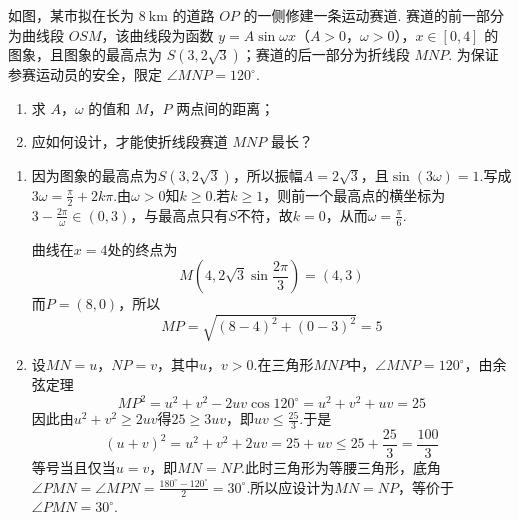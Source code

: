 \begin{problem}
如图，某市拟在长为 \(8 \mathrm{~km}\) 的道路 \(OP\) 的一侧修建一条运动赛道. 赛道的前一部分为曲线段 \(OSM\)，该曲线段为函数 \(y = A \sin \omega x\)（\(A > 0\)，\(\omega > 0\)），\(x \in [0,4]\) 的图象，且图象的最高点为 \(S(3, 2\sqrt{3})\)；赛道的后一部分为折线段 \(MNP\). 为保证参赛运动员的安全，限定 \(\angle MNP = 120^{\circ}\).

\begin{enumerate}
\item 求 \(A\)，\(\omega\) 的值和 \(M\)，\(P\) 两点间的距离；
\item 应如何设计，才能使折线段赛道 \(MNP\) 最长？
\end{enumerate}

\begin{solution}
\begin{enumerate}
\item 因为图象的最高点为\(S(3,2\sqrt{3})\)，所以振幅\(A=2\sqrt{3}\)，且\(\sin(3\omega)=1\).写成\(3\omega=\frac{\pi}{2}+2k\pi\).由\(\omega>0\)知\(k\geqslant0\).若\(k\geqslant1\)，则前一个最高点的横坐标为\(3-\frac{2\pi}{\omega}\in(0,3)\)，与最高点只有\(S\)不符，故\(k=0\)，从而\(\omega=\frac{\pi}{6}\).

曲线在\(x=4\)处的终点为
\[
M\left(4,2\sqrt{3}\sin\frac{2\pi}{3}\right)=(4,3)
\]
而\(P=(8,0)\)，所以
\[
MP=\sqrt{(8-4)^2+(0-3)^2}=5
\]

\item 设\(MN=u\)，\(NP=v\)，其中\(u\)，\(v>0\).在三角形\(MNP\)中，\(\angle MNP=120^{\circ}\)，由余弦定理
\[
MP^2=u^2+v^2-2uv\cos120^{\circ}=u^2+v^2+uv=25
\]
因此由\(u^2+v^2\geqslant2uv\)得\(25\geqslant3uv\)，即\(uv\leqslant\frac{25}{3}\).于是
\[
(u+v)^2=u^2+v^2+2uv=25+uv\leqslant25+\frac{25}{3}=\frac{100}{3}
\]
等号当且仅当\(u=v\)，即\(MN=NP\).此时三角形为等腰三角形，底角
\(\angle PMN=\angle MPN=\frac{180^{\circ}-120^{\circ}}{2}=30^{\circ}\).所以应设计为\(MN=NP\)，等价于\(\angle PMN=30^{\circ}\).
\end{enumerate}
\end{solution}
\end{problem}

